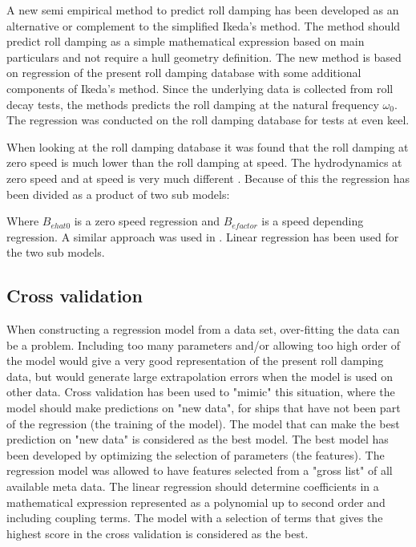 A new semi empirical method to predict roll damping has been developed as an alternative or complement to the simplified Ikeda's method. The method should predict roll damping as a simple mathematical expression based on main particulars and not require a hull geometry definition. 
The new method is based on regression of the present roll damping database with some additional components of Ikeda's method. Since the underlying data is collected from roll decay tests, the methods predicts the roll damping at the natural frequency $\omega_0$.  
The regression was conducted on the roll damping database for tests at even keel. 

When looking at the roll damping database it was found that the roll damping at zero speed is much lower than the roll damping at speed. The hydrodynamics at zero speed and at speed is very much different \parencite{ikeda_velocity_1979}. Because of this the regression has been divided as a product of two sub models:

Where $B_{ehat0}$ is a zero speed regression and $B_{efactor}$ is a speed depending regression. A similar approach was used in \parencite{henry_peter_piehl_ship_2016}. Linear regression has been used for the two sub models. 

\subsection{Cross validation}
When constructing a regression model from a data set, over-fitting the data can be a problem. Including too many parameters and/or allowing too high order of the model would give a very good representation of the present roll damping data, but would generate large extrapolation errors when the model is used on other data. Cross validation has been used to "mimic" this situation, where the model should make predictions on "new data", for ships that have not been part of the regression (the training of the model). The model that can make the best prediction on "new data" is considered as the best model. The best model has been developed by optimizing the selection of parameters (the features). The regression model was allowed to have features selected from a "gross list" of all available meta data. The linear regression should determine coefficients in a mathematical expression represented as a polynomial up to second order and including coupling terms. The model with a selection of terms that gives the highest score in the cross validation is considered as the best.    

